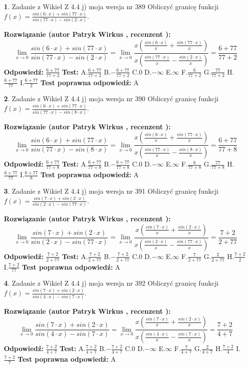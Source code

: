 \documentclass[12pt, a4paper]{article}
\theoremstyle{definition} %
\newtheorem{zad}{}
\newcommand{\zadStart}[1]{\begin{zad}#1\newline}
\newcommand{\zadStop}{\end{zad}}
\newcommand{\rozwStart}[2]{\noindent \textbf{Rozwiązanie (autor #1 , recenzent #2): }\newline}
\newcommand{\rozwStop}{\newline}
\newcommand{\odpStart}{\noindent \textbf{Odpowiedź:}\newline}
\newcommand{\odpStop}{\newline}
\newcommand{\testStart}{\noindent \textbf{Test:}\newline}
\newcommand{\testStop}{\newline}
\newcommand{\kluczStart}{\noindent \textbf{Test poprawna odpowiedź:}\newline}
\newcommand{\kluczStop}{\newline}
\begin{document}
\zadStart{Zadanie z Wikieł Z 4.4 j) moja wersja nr 389}
Obliczyć granicę funkcji $f(x)=\frac{sin(6\cdot x) +sin(77\cdot x)}{sin(77\cdot x) -sin(2\cdot x)}$.
\zadStop
\rozwStart{Patryk Wirkus}{}
$$\lim\limits_{x\to 0}\frac{sin(6\cdot x) +sin(77\cdot x)}{sin(77\cdot x) -sin(2\cdot x)}=\lim\limits_{x\to 0}\frac{x(\frac{sin(6\cdot x)}{x}+\frac{sin(77\cdot x)}{x})}{x(\frac{sin(77\cdot x)}{x}-\frac{sin(2\cdot x)}{x})}=\frac{6+77}{77+2}$$
\rozwStop
\odpStart
$\frac{6+77}{77+2}$
\odpStop
\testStart
A.$\frac{6+77}{77+2}$
B.$-\frac{6+77}{77+2}$
C.$0$
D.$-\infty$
E.$\infty$
F.$\frac{6}{77+2}$
G.$\frac{77}{77+2}$
H.$\frac{6+77}{77}$
I.$\frac{6+77}{2}$
\testStop
\kluczStart
A
\kluczStop



\zadStart{Zadanie z Wikieł Z 4.4 j) moja wersja nr 390}
Obliczyć granicę funkcji $f(x)=\frac{sin(6\cdot x) +sin(77\cdot x)}{sin(77\cdot x) -sin(8\cdot x)}$.
\zadStop
\rozwStart{Patryk Wirkus}{}
$$\lim\limits_{x\to 0}\frac{sin(6\cdot x) +sin(77\cdot x)}{sin(77\cdot x) -sin(8\cdot x)}=\lim\limits_{x\to 0}\frac{x(\frac{sin(6\cdot x)}{x}+\frac{sin(77\cdot x)}{x})}{x(\frac{sin(77\cdot x)}{x}-\frac{sin(8\cdot x)}{x})}=\frac{6+77}{77+8}$$
\rozwStop
\odpStart
$\frac{6+77}{77+8}$
\odpStop
\testStart
A.$\frac{6+77}{77+8}$
B.$-\frac{6+77}{77+8}$
C.$0$
D.$-\infty$
E.$\infty$
F.$\frac{6}{77+8}$
G.$\frac{77}{77+8}$
H.$\frac{6+77}{77}$
I.$\frac{6+77}{8}$
\testStop
\kluczStart
A
\kluczStop



\zadStart{Zadanie z Wikieł Z 4.4 j) moja wersja nr 391}
Obliczyć granicę funkcji $f(x)=\frac{sin(7\cdot x) +sin(2\cdot x)}{sin(2\cdot x) -sin(77\cdot x)}$.
\zadStop
\rozwStart{Patryk Wirkus}{}
$$\lim\limits_{x\to 0}\frac{sin(7\cdot x) +sin(2\cdot x)}{sin(2\cdot x) -sin(77\cdot x)}=\lim\limits_{x\to 0}\frac{x(\frac{sin(7\cdot x)}{x}+\frac{sin(2\cdot x)}{x})}{x(\frac{sin(2\cdot x)}{x}-\frac{sin(77\cdot x)}{x})}=\frac{7+2}{2+77}$$
\rozwStop
\odpStart
$\frac{7+2}{2+77}$
\odpStop
\testStart
A.$\frac{7+2}{2+77}$
B.$-\frac{7+2}{2+77}$
C.$0$
D.$-\infty$
E.$\infty$
F.$\frac{7}{2+77}$
G.$\frac{2}{2+77}$
H.$\frac{7+2}{2}$
I.$\frac{7+2}{77}$
\testStop
\kluczStart
A
\kluczStop



\zadStart{Zadanie z Wikieł Z 4.4 j) moja wersja nr 392}
Obliczyć granicę funkcji $f(x)=\frac{sin(7\cdot x) +sin(2\cdot x)}{sin(4\cdot x) -sin(7\cdot x)}$.
\zadStop
\rozwStart{Patryk Wirkus}{}
$$\lim\limits_{x\to 0}\frac{sin(7\cdot x) +sin(2\cdot x)}{sin(4\cdot x) -sin(7\cdot x)}=\lim\limits_{x\to 0}\frac{x(\frac{sin(7\cdot x)}{x}+\frac{sin(2\cdot x)}{x})}{x(\frac{sin(4\cdot x)}{x}-\frac{sin(7\cdot x)}{x})}=\frac{7+2}{4+7}$$
\rozwStop
\odpStart
$\frac{7+2}{4+7}$
\odpStop
\testStart
A.$\frac{7+2}{4+7}$
B.$-\frac{7+2}{4+7}$
C.$0$
D.$-\infty$
E.$\infty$
F.$\frac{7}{4+7}$
G.$\frac{2}{4+7}$
H.$\frac{7+2}{4}$
I.$\frac{7+2}{7}$
\testStop
\kluczStart
A
\kluczStop
\end{document}
